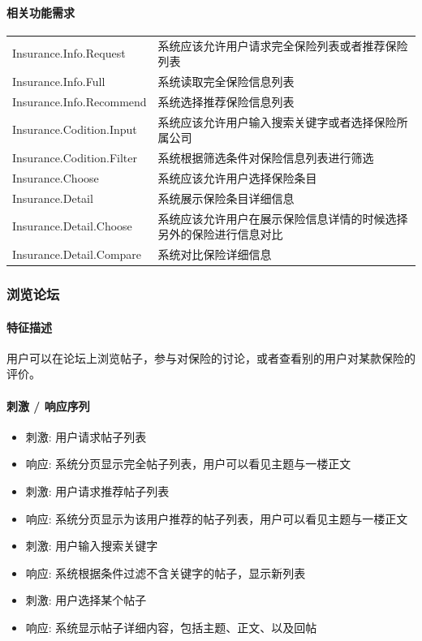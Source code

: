 \documentclass[a4paper]{ctexart}
\begin{document}
\paragraph{相关功能需求}

\begin{center}
    \begin{tabular}{p{6cm}|p{8cm}}
      \toprule
      Insurance.Info.Request & 系统应该允许用户请求完全保险列表或者推荐保险列表 \\
      Insurance.Info.Full & 系统读取完全保险信息列表      \\
      Insurance.Info.Recommend & 系统选择推荐保险信息列表 \\
      \midrule
      Insurance.Codition.Input & 系统应该允许用户输入搜索关键字或者选择保险所属公司\\
      Insurance.Codition.Filter & 系统根据筛选条件对保险信息列表进行筛选 \\
      \midrule
      Insurance.Choose & 系统应该允许用户选择保险条目 \\
      Insurance.Detail & 系统展示保险条目详细信息 \\
      \midrule
      Insurance.Detail.Choose & 系统应该允许用户在展示保险信息详情的时候选择另外的保险进行信息对比 \\
      Insurance.Detail.Compare  & 系统对比保险详细信息                      \\
      \bottomrule
    \end{tabular}
\end{center}

\subsubsection{浏览论坛}

\paragraph{特征描述}
用户可以在论坛上浏览帖子，参与对保险的讨论，或者查看别的用户对某款保险的评价。


\paragraph{刺激 / 响应序列}

\begin{itemize}
  \item 刺激: 用户请求帖子列表
  \item 响应: 系统分页显示完全帖子列表，用户可以看见主题与一楼正文
  \item 刺激: 用户请求推荐帖子列表
  \item 响应: 系统分页显示为该用户推荐的帖子列表，用户可以看见主题与一楼正文
  \item 刺激: 用户输入搜索关键字
  \item 响应: 系统根据条件过滤不含关键字的帖子，显示新列表
  \item 刺激: 用户选择某个帖子
  \item 响应: 系统显示帖子详细内容，包括主题、正文、以及回帖
\end{itemize}
\end{document}
